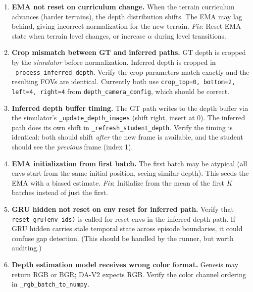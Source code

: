\documentclass[11pt,a4paper]{article}
\begin{document}
\begin{enumerate}[label=\textbf{B\arabic*}]
  \item \textbf{EMA not reset on curriculum change.}
        When the terrain curriculum advances (harder terrains), the depth
        distribution shifts.  The EMA may lag behind, giving incorrect
        normalization for the new terrain.  \emph{Fix}: Reset EMA state when
        terrain level changes, or increase $\alpha$ during level transitions.

  \item \textbf{Crop mismatch between GT and inferred paths.}
        GT depth is cropped by the \emph{simulator} before normalization.
        Inferred depth is cropped in \texttt{\_process\_inferred\_depth}.
        Verify the crop parameters match exactly and the resulting FOVs are
        identical.  Currently both use
        \texttt{crop\_top=0, bottom=2, left=4, right=4} from
        \texttt{depth\_camera\_config}, which should be correct.

  \item \textbf{Inferred depth buffer timing.}
        The GT path writes to the depth buffer via the simulator's
        \texttt{\_update\_depth\_images} (shift right, insert at 0).
        The inferred path does its own shift in
        \texttt{\_refresh\_student\_depth}.  Verify the timing is identical:
        both should shift \emph{after} the new frame is available, and the
        student should see the \emph{previous} frame (index 1).

  \item \textbf{EMA initialization from first batch.}
        The first batch may be atypical (all envs start from the same initial
        position, seeing similar depth).  This seeds the EMA with a biased
        estimate.  \emph{Fix}: Initialize from the mean of the first $K$
        batches instead of just the first.

  \item \textbf{GRU hidden not reset on env reset for inferred path.}
        Verify that \texttt{reset\_gru(env\_ids)} is called for reset envs
        in the inferred depth path.  If GRU hidden carries stale temporal
        state across episode boundaries, it could confuse gap detection.
        (This should be handled by the runner, but worth auditing.)

  \item \textbf{Depth estimation model receives wrong color format.}
        Genesis may return RGB or BGR; DA-V2 expects RGB.  Verify the color
        channel ordering in \texttt{\_rgb\_batch\_to\_numpy}.
\end{enumerate}
\end{document}
